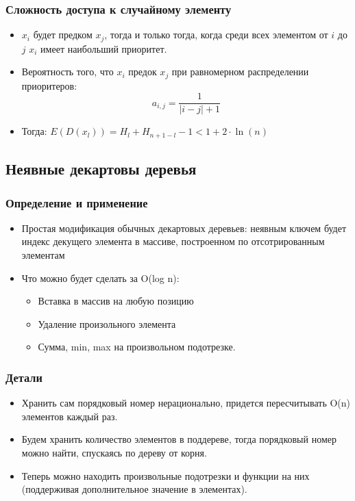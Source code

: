 \documentclass[hyperref={unicode=true}]{beamer}
\begin{document}
\frame
{
\frametitle{Сложность доступа к случайному элементу}
\begin{itemize}
  \item $x_i$ будет предком $x_j$, тогда и только тогда, когда среди всех элементом от $i$ до $j$ $x_i$ имеет наибольший приоритет.
  \item Вероятность того, что $x_i$ предок $x_j$ при равномерном распределении приоритеров:
    $$
      a_{i,j} = \frac{1}{|i -j| + 1}
    $$
   \item Тогда: $E(D(x_l)) = H_l + H_{n+1-l} - 1 < 1 + 2\cdot\ln(n)$
\end{itemize}
}
 
\subsection{Неявные декартовы деревья}
\frame
{
\frametitle{Определение и применение}
   \begin{itemize}
   \item Простая модификация обычных декартовых деревьев: неявным ключем будет индекс декущего элемента в массиве, построенном по отсотрированным элементам
   \item Что можно будет сделать за O(log n):
      \begin{itemize}
        \item Вставка в массив на любую позицию
        \item Удаление произольного элемента
        \item Сумма, min, max на произвольном подотрезке.
      \end{itemize}
  \end{itemize}
}

\frame
{
\frametitle{Детали}
  \begin{itemize}
    \item Хранить сам порядковый номер нерационально, придется пересчитывать O(n) элементов каждый раз.
    \item Будем хранить количество элементов в поддереве, тогда порядковый номер можно найти, спускаясь по дереву от корня.
    \item Теперь можно находить произвольные подотрезки и функции на них (поддерживая дополнительное значение в элементах).
  \end{itemize}
}
\end{document}
